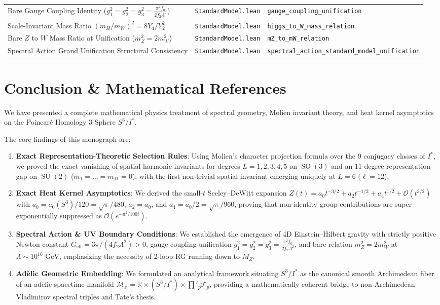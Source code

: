 \documentclass[11pt,a4paper]{article}
\theoremstyle{definition}
\DeclareMathOperator{\SU}{SU}
\DeclareMathOperator{\SO}{SO}
\begin{document}
\begin{table}[htbp]
\begin{tabularx}{\textwidth}{llX}
Bare Gauge Coupling Identity ($g_1^2 = g_2^2 = g_3^2 = \frac{\pi^2 f_0}{2 f_2 \Lambda^2}$) & \texttt{StandardModel.lean} & \texttt{gauge\_coupling\_unification} \\
Scale-Invariant Mass Ratio $(m_H/m_W)^2 = 8 Y_4 / Y_2^2$ & \texttt{StandardModel.lean} & \texttt{higgs\_to\_W\_mass\_relation} \\
Bare $Z$ to $W$ Mass Ratio at Unification ($m_Z^2 = 2 m_W^2$) & \texttt{StandardModel.lean} & \texttt{mZ\_to\_mW\_relation} \\
Spectral Action Grand Unification Structural Consistency & \texttt{StandardModel.lean} & \texttt{spectral\_action\_standard\_model\_unification} \\
\bottomrule
\end{tabularx}
\end{table}

\section{Conclusion \& Mathematical References}

We have presented a complete mathematical physics treatment of spectral geometry, Molien invariant theory, and heat kernel asymptotics on the Poincar\'e Homology 3-Sphere $S^3 / I^*$.

The core findings of this monograph are:
\begin{enumerate}
\item \textbf{Exact Representation-Theoretic Selection Rules}: Using Molien's character projection formula over the 9 conjugacy classes of $I^*$, we proved the exact vanishing of spatial harmonic invariants for degrees $L = 1, 2, 3, 4, 5$ on $\SO(3)$ and an 11-degree representation gap on $\SU(2)$ ($m_1 = \dots = m_{11} = 0$), with the first non-trivial spatial invariant emerging uniquely at $L = 6$ ($\ell = 12$).
\item \textbf{Exact Heat Kernel Asymptotics}: We derived the small-$t$ Seeley--DeWitt expansion $Z(t) = a_0 t^{-3/2} + a_2 t^{-1/2} + a_4 t^{1/2} + \mathcal{O}(t^{3/2})$ with $a_0 = a_0(S^3)/120 = \sqrt{\pi}/480$, $a_2 = a_0$, and $a_4 = a_0/2 = \sqrt{\pi}/960$, proving that non-identity group contributions are super-exponentially suppressed as $\mathcal{O}(e^{-\pi^2/100t})$.
\item \textbf{Spectral Action \& UV Boundary Conditions}: We established the emergence of 4D Einstein--Hilbert gravity with strictly positive Newton constant $G_{\mathrm{eff}} = 3\pi/(4 f_2 \Lambda^2) > 0$, gauge coupling unification $g_1^2 = g_2^2 = g_3^2 = \frac{\pi^2 f_0}{2 f_2 \Lambda^2}$, and bare relation $m_Z^2 = 2 m_W^2$ at $\Lambda \sim 10^{16}\text{ GeV}$, emphasizing the necessity of 2-loop RG running down to $M_Z$.
\item \textbf{Ad\`elic Geometric Embedding}: We formulated an analytical framework situating $S^3 / I^*$ as the canonical smooth Archimedean fiber of an ad\`elic spacetime manifold $\mathcal{M}_{\mathbb{A}} = \mathbb{R} \times (S^3/I^*) \times \prod'_p \mathcal{T}_p$, providing a mathematically coherent bridge to non-Archimedean Vladimirov spectral triples and Tate's thesis.
\end{enumerate}
\end{document}
